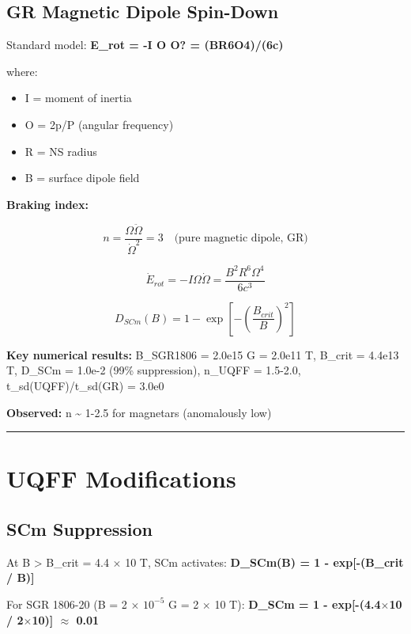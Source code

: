 \documentclass[12pt,a4paper]{article}
\begin{document}
\subsection{GR Magnetic Dipole Spin-Down}

Standard model: \textbf{E\_rot = -I O O? = (BR6O4)/(6c)}

where:

\begin{itemize}
  \item I = moment of inertia
  \item O = 2p/P (angular frequency)
  \item R = NS radius
  \item B = surface dipole field
\end{itemize}

\textbf{Braking index:}

\begin{equation}
n = \frac{\Omega \ddot{\Omega}}{\dot{\Omega}^2} = 3 \quad \text{(pure magnetic dipole, GR)}
\end{equation}

\begin{equation}
\dot{E}_{rot} = -I \Omega \dot{\Omega} = \frac{B^2 R^6 \Omega^4}{6c^3}
\end{equation}

\begin{equation}
D_{SCm}(B) = 1 - \exp\!\left[-\left(\frac{B_{crit}}{B}\right)^2\right]
\end{equation}

\textbf{Key numerical results:} B\_SGR1806 = 2.0e15 G = 2.0e11 T, B\_crit = 4.4e13 T, D\_SCm = 1.0e-2 (99\% suppression), n\_UQFF = 1.5-2.0, t\_sd(UQFF)/t\_sd(GR) = 3.0e0

\textbf{Observed:} n \textasciitilde{} 1-2.5 for magnetars (anomalously low)

\medskip\hrule\medskip

\section{UQFF Modifications}

\subsection{SCm Suppression}

At B > B\_crit = 4.4 $\times$ 10 T, SCm activates: \textbf{D\_SCm(B) = 1 - exp[-(B\_crit / B)]}

For SGR 1806-20 (B = 2 $\times$ $10^{-5}$ G = 2 $\times$ 10 T): \textbf{D\_SCm = 1 - exp[-(4.4$\times$10 / 2$\times$10)] $\approx$ 0.01}
\end{document}
